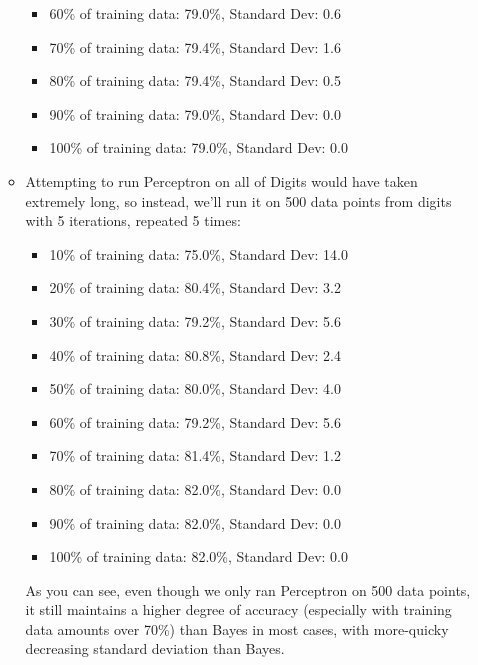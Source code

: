 \documentclass[11pt]{article}
\begin{document}
\begin{itemize}
\begin{itemize}
\begin{itemize}
				\item 60\% of training data: 79.0\%, Standard Dev: 0.6
				\item 70\% of training data: 79.4\%, Standard Dev: 1.6
				\item 80\% of training data: 79.4\%, Standard Dev: 0.5
				\item 90\% of training data: 79.0\%, Standard Dev: 0.0
				\item 100\% of training data: 79.0\%, Standard Dev: 0.0
			\end{itemize}
			\item Attempting to run Perceptron on all of Digits would have taken extremely long, so instead, we'll run it on 500 data points from digits with 5 iterations, repeated 5 times:
			\begin{itemize}
				\item 10\% of training data: 75.0\%, Standard Dev: 14.0
				\item 20\% of training data: 80.4\%, Standard Dev: 3.2
				\item 30\% of training data: 79.2\%, Standard Dev: 5.6
				\item 40\% of training data: 80.8\%, Standard Dev: 2.4
				\item 50\% of training data: 80.0\%, Standard Dev: 4.0
				\item 60\% of training data: 79.2\%, Standard Dev: 5.6
				\item 70\% of training data: 81.4\%, Standard Dev: 1.2
				\item 80\% of training data: 82.0\%, Standard Dev: 0.0
				\item 90\% of training data: 82.0\%, Standard Dev: 0.0
				\item 100\% of training data: 82.0\%, Standard Dev: 0.0
			\end{itemize}
			As you can see, even though we only ran Perceptron on 500 data points, it still maintains a higher degree of accuracy (especially with training data amounts over 70\%) than Bayes in most cases, with more-quicky decreasing standard deviation than Bayes.
		\end{itemize}
	\end{itemize}
\end{document}
